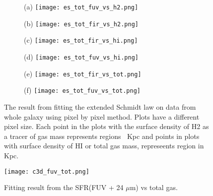 \documentclass[useAMS,usenatbib]{mn2e}
\begin{document}


\begin{figure}
	\begin{subfigure}\\(a){}
  	\left
	\texttt{[image: es\_tot\_fuv\_vs\_h2.png]}
 	\end{subfigure}%

	 \begin{subfigure}\\(b){}
	\right
	\texttt{[image: es\_tot\_fir\_vs\_h2.png]}
 	\end{subfigure}
	
	 \begin{subfigure}\\(c){}
 	\left
	\texttt{[image: es\_tot\_fir\_vs\_hi.png]}
 	\end{subfigure}

 	\begin{subfigure}\\(d){}
   	\right
	\texttt{[image: es\_tot\_fuv\_vs\_hi.png]}
 	\end{subfigure}

 	\begin{subfigure}\\(e){}
   	\left
	\texttt{[image: es\_tot\_fir\_vs\_tot.png]}
 	\end{subfigure}

 	\begin{subfigure}\\(f){}
   	\right
	\texttt{[image: es\_tot\_fuv\_vs\_tot.png]}
	 \end{subfigure}

\caption{The result from fitting the extended Schmidt law on data from whole galaxy using pixel by pixel method. Plots have a different pixel size. Each point in the plots with the surface density of H2 as a tracer of gas mass represents regions $~$ Kpc and points in plots with surface density of HI or total gas mass, represeents region in $~$Kpc.}
   \label{fig:es,all}
 \end{figure}

\begin{figure*}
\centering
\texttt{[image: c3d\_fuv\_tot.png]}
\caption{Fitting result from the SFR(FUV + 24 $\mu$m) vs total gas.}
\label{fig:es,regs,fuv,tot}
\end{figure*}
\end{document}
